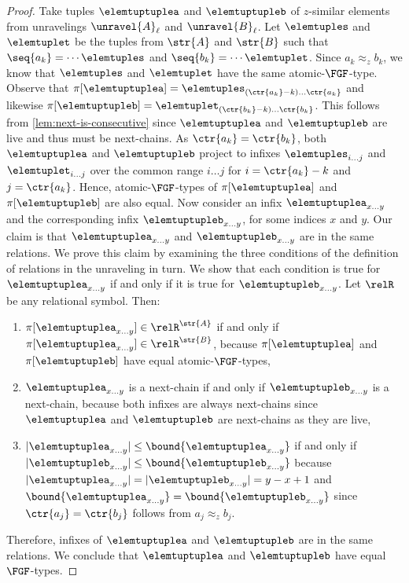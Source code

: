 \begin{proof}
  Take tuples $\elemtuptuplea$ and $\elemtuptupleb$ of $z$-similar elements from unravelings $\unravel{A}_{\ell}$ and $\unravel{B}_{\ell}$.
  Let $\elemtuples$ and $\elemtuplet$ be the tuples from $\str{A}$ and $\str{B}$ such that $\seq{a_{k}} = \cdots \elemtuples$ and $\seq{b_{k}} = \cdots \elemtuplet$.
  Since $a_{k} \approx_z b_{k}$, we know that $\elemtuples$ and $\elemtuplet$ have the same atomic-$\FGF$-type.
  Observe that $\pi[\elemtuptuplea] = \elemtuples_{(\ctr{a_{k}}-k)\ldots{}\ctr{a_{k}}}$ and likewise $\pi[\elemtuptupleb] = \elemtuplet_{(\ctr{b_{k}}-k)\ldots{}\ctr{b_{k}}}$.
  This follows from \cref{lem:next-is-consecutive} since $\elemtuptuplea$ and $\elemtuptupleb$ are live and thus must be next-chains.
  As $\ctr{a_{k}} = \ctr{b_{k}}$, both $\elemtuptuplea$ and $\elemtuptupleb$ project to infixes $\elemtuples_{i\ldots{}j}$ and $\elemtuplet_{i\ldots{}j}$ over the common range $i\ldots{}j$ for $i = \ctr{a_{k}} - k$ and $j = \ctr{a_{k}}$.
  Hence, atomic-$\FGF$-types of $\pi[\elemtuptuplea]$ and $\pi[\elemtuptupleb]$ are also equal.
  Now consider an infix $\elemtuptuplea_{x\ldots{}y}$ and the corresponding infix $\elemtuptupleb_{x\ldots{}y}$, for some indices $x$ and $y$.
  Our claim is that $\elemtuptuplea_{x\ldots{}y}$ and $\elemtuptupleb_{x\ldots{}y}$ are in the same relations.
  We prove this claim by examining the three conditions of the definition of relations in the unraveling in turn.
  We show that each condition is true for $\elemtuptuplea_{x\ldots{}y}$ if and only if it is true for $\elemtuptupleb_{x\ldots{}y}$.
  Let $\relR$ be any relational symbol. Then:
  \begin{enumerate}
    \item $\pi[\elemtuptuplea_{x\ldots{}y}] \in \relR^{\str{A}}$ if and only if $\pi[\elemtuptuplea_{x\ldots{}y}] \in \relR^{\str{B}}$, because $\pi[\elemtuptuplea]$ and $\pi[\elemtuptupleb]$ have equal atomic-$\FGF$-types,
    \item $\elemtuptuplea_{x\ldots{}y}$ is a next-chain if and only if $\elemtuptupleb_{x\ldots{}y}$ is a next-chain, because both infixes are always next-chains since $\elemtuptuplea$ and $\elemtuptupleb$ are next-chains as they are live,
    \item $|\elemtuptuplea_{x\ldots{}y}| \le \bound{\elemtuptuplea_{x\ldots{}y}}$ if and only if $|\elemtuptupleb_{x\ldots{}y}| \le \bound{\elemtuptupleb_{x\ldots{}y}}$ because $|\elemtuptuplea_{x\ldots{}y}| = |\elemtuptupleb_{x\ldots{}y}| = y-x+1$ and $\bound{\elemtuptuplea_{x\ldots{}y}} = \bound{\elemtuptupleb_{x\ldots{}y}}$ since $\ctr{a_{j}} = \ctr{b_{j}}$ follows from $a_{j} \approx_{z} b_{j}$.
  \end{enumerate}
  Therefore, infixes of $\elemtuptuplea$ and $\elemtuptupleb$ are in the same relations.
  We conclude that $\elemtuptuplea$ and $\elemtuptupleb$ have equal $\FGF$-types.
\end{proof}
